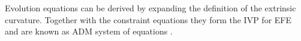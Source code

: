 %

Evolution equations can be derived by expanding the definition of the 
extrinsic curvature.
Together with the constraint equations they form the \ac{IVP} for \ac{EFE} 
and are known as \ac{ADM} system of equations \citep[\eg][]{Arnowitt:1962hi}.




